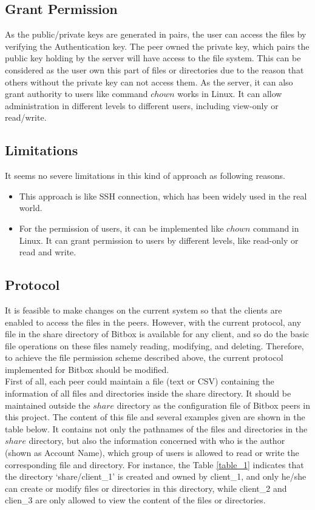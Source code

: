 \documentclass[a4paper,10pt,titlepage,twocolumn]{article}
\begin{document}
    \subsection{Grant Permission}
    As the public/private keys are generated in pairs, the user can access the files by verifying the Authentication key. The peer owned the private key, which pairs the public key holding by the server will have access to the file system. This can be considered as the user own this part of files or directories due to the reason that others without the private key can not access them. As the server, it can also grant authority to users like command $chown$ works in Linux. It can allow administration in different levels to different users, including view-only or read/write.
    \subsection{Limitations}
    It seems no severe limitations in this kind of approach as following reasons.
    \begin{itemize}
        \item This approach is like SSH connection, which has been widely used in the real world. 
        \item For the permission of users, it can be implemented like $chown$ command in Linux. It can grant permission to users by different levels, like read-only or read and write.
    \end{itemize}
    \subsection{Protocol}
    It is feasible to make changes on the current system so that the clients are enabled to access the files in the peers. However, with the current protocol, any file in the share directory of Bitbox is available for any client, and so do the basic file operations on these files namely reading, modifying, and deleting. Therefore, to achieve the file permission scheme described above, the current protocol implemented for Bitbox should be modified.
    \\First of all, each peer could maintain a file (text or CSV) containing the information of all files and directories inside the share directory. It should be maintained outside the $share$ directory as the configuration file of Bitbox peers in this project. The content of this file and several examples given are shown in the table below. It contains not only the pathnames of the files and directories in the $share$ directory, but also the information concerned with who is the author (shown as Account Name), which group of users is allowed to read or write the corresponding file and directory. For instance, the Table \ref{table_1} indicates that the directory ‘share/client\_1’ is created and owned by client\_1, and only he/she can create or modify files or directories in this directory, while client\_2 and clien\_3 are only allowed to view the content of the files or directories.
\end{document}
